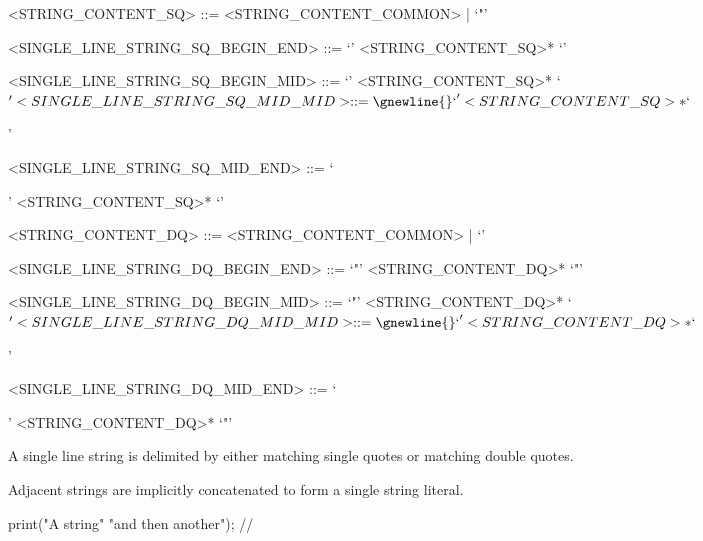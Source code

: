 \documentclass[makeidx]{article}
\begin{document}
{\begin{grammar}
<STRING\_CONTENT\_SQ> ::= <STRING\_CONTENT\_COMMON> | `"'

<SINGLE\_LINE\_STRING\_SQ\_BEGIN\_END> ::= \gnewline{}
  `\sq' <STRING\_CONTENT\_SQ>* `\sq'

<SINGLE\_LINE\_STRING\_SQ\_BEGIN\_MID> ::= \gnewline{}
  `\sq' <STRING\_CONTENT\_SQ>* `${'

<SINGLE\_LINE\_STRING\_SQ\_MID\_MID> ::= \gnewline{}
  `}' <STRING\_CONTENT\_SQ>* `${'

<SINGLE\_LINE\_STRING\_SQ\_MID\_END> ::= \gnewline{}
  `}' <STRING\_CONTENT\_SQ>* `\sq'

<STRING\_CONTENT\_DQ> ::= <STRING\_CONTENT\_COMMON> | `\sq'

<SINGLE\_LINE\_STRING\_DQ\_BEGIN\_END> ::= \gnewline{}
  `"' <STRING\_CONTENT\_DQ>* `"'

<SINGLE\_LINE\_STRING\_DQ\_BEGIN\_MID> ::= \gnewline{}
  `"' <STRING\_CONTENT\_DQ>* `${'

<SINGLE\_LINE\_STRING\_DQ\_MID\_MID> ::= \gnewline{}
  `}' <STRING\_CONTENT\_DQ>* `${'

<SINGLE\_LINE\_STRING\_DQ\_MID\_END> ::= \gnewline{}
  `}' <STRING\_CONTENT\_DQ>* `"'
\end{grammar}

\LMHash{}%
A single line string is delimited by
either matching single quotes or matching double quotes.



\LMHash{}%
Adjacent strings are implicitly concatenated to form a single string literal.


\begin{dartCode}
print("A string" "and then another"); // 
\end{dartCode}


}
\end{document}
